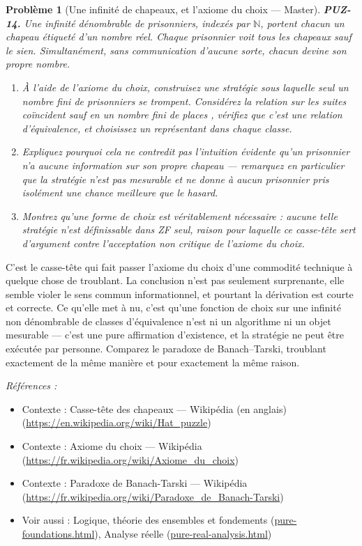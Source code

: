 \documentclass[11pt]{article}
\newtheorem{problem}{Problème}
\newenvironment{refs}{\par\small\noindent\emph{Références :}\begin{itemize}\setlength\itemsep{0pt}}{\end{itemize}\normalsize}
\begin{document}
\begin{problem}[{Une infinité de chapeaux, et l'axiome du choix --- Master}]
\textbf{PUZ-14.} Une infinité dénombrable de prisonniers, indexés par $ \mathbb{N} $,
portent chacun un chapeau étiqueté d'un nombre réel. Chaque prisonnier voit tous les
chapeaux sauf le sien. Simultanément, sans communication d'aucune sorte, chacun devine son
propre nombre.
\begin{enumerate}
\item[(a)] À l'aide de l'axiome du choix, construisez une stratégie sous laquelle seul un nombre
fini de prisonniers se trompent. Considérez la relation sur les suites \og{} coïncident sauf en
un nombre fini de places \fg{}, vérifiez que c'est une relation d'équivalence, et choisissez un
représentant dans chaque classe.
\item[(b)] Expliquez pourquoi cela ne contredit pas l'intuition évidente qu'un prisonnier n'a
aucune information sur son propre chapeau --- remarquez en particulier que la stratégie n'est
pas mesurable et ne donne à aucun prisonnier pris isolément une chance meilleure que le
hasard.
\item[(c)] Montrez qu'une forme de choix est véritablement nécessaire : aucune telle stratégie
n'est définissable dans ZF seul, raison pour laquelle ce casse-tête sert d'argument contre
l'acceptation non critique de l'axiome du choix.
\end{enumerate}

\end{problem}

\noindent C'est le casse-tête qui fait passer l'axiome du choix d'une commodité
technique à quelque chose de troublant. La conclusion n'est pas seulement surprenante, elle
semble violer le sens commun informationnel, et pourtant la dérivation est courte et
correcte. Ce qu'elle met à nu, c'est qu'une fonction de choix sur une infinité non
dénombrable de classes d'équivalence n'est ni un algorithme ni un objet mesurable --- c'est une
pure affirmation d'existence, et la \og{} stratégie \fg{} ne peut être exécutée par personne.
Comparez le paradoxe de Banach--Tarski, troublant exactement de la même manière et pour
exactement la même raison.

\begin{refs}
\item Contexte : Casse-tête des chapeaux --- Wikipédia (en anglais) (\url{https://en.wikipedia.org/wiki/Hat_puzzle})
\item Contexte : Axiome du choix --- Wikipédia (\url{https://fr.wikipedia.org/wiki/Axiome_du_choix})
\item Contexte : Paradoxe de Banach-Tarski --- Wikipédia (\url{https://fr.wikipedia.org/wiki/Paradoxe_de_Banach-Tarski})
\item Voir aussi : Logique, théorie des ensembles et fondements (\url{pure-foundations.html}), Analyse réelle (\url{pure-real-analysis.html})
\end{refs}
\end{document}
